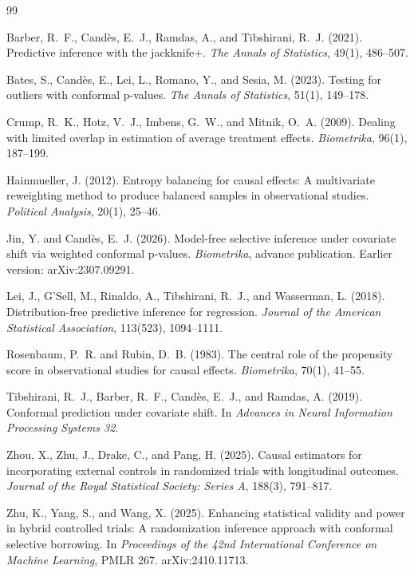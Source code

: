 \documentclass[11pt]{article}
\begin{document}
\begin{thebibliography}{99}

Barber, R.~F., Cand\`es, E.~J., Ramdas, A., and Tibshirani, R.~J. (2021).
Predictive inference with the jackknife+.
\emph{The Annals of Statistics}, 49(1), 486--507.

Bates, S., Cand\`es, E., Lei, L., Romano, Y., and Sesia, M. (2023).
Testing for outliers with conformal p-values.
\emph{The Annals of Statistics}, 51(1), 149--178.

Crump, R.~K., Hotz, V.~J., Imbens, G.~W., and Mitnik, O.~A. (2009).
Dealing with limited overlap in estimation of average treatment effects.
\emph{Biometrika}, 96(1), 187--199.

Hainmueller, J. (2012).
Entropy balancing for causal effects: A multivariate reweighting method to produce balanced samples in observational studies.
\emph{Political Analysis}, 20(1), 25--46.

Jin, Y. and Cand\`es, E.~J. (2026).
Model-free selective inference under covariate shift via weighted conformal p-values.
\emph{Biometrika}, advance publication. Earlier version: arXiv:2307.09291.

Lei, J., G'Sell, M., Rinaldo, A., Tibshirani, R.~J., and Wasserman, L. (2018).
Distribution-free predictive inference for regression.
\emph{Journal of the American Statistical Association}, 113(523), 1094--1111.

Rosenbaum, P.~R. and Rubin, D.~B. (1983).
The central role of the propensity score in observational studies for causal effects.
\emph{Biometrika}, 70(1), 41--55.

Tibshirani, R.~J., Barber, R.~F., Cand\`es, E.~J., and Ramdas, A. (2019).
Conformal prediction under covariate shift.
In \emph{Advances in Neural Information Processing Systems 32}.

Zhou, X., Zhu, J., Drake, C., and Pang, H. (2025).
Causal estimators for incorporating external controls in randomized trials with longitudinal outcomes.
\emph{Journal of the Royal Statistical Society: Series A}, 188(3), 791--817.

Zhu, K., Yang, S., and Wang, X. (2025).
Enhancing statistical validity and power in hybrid controlled trials: A randomization inference approach with conformal selective borrowing.
In \emph{Proceedings of the 42nd International Conference on Machine Learning}, PMLR 267. arXiv:2410.11713.

\end{thebibliography}
\end{document}
